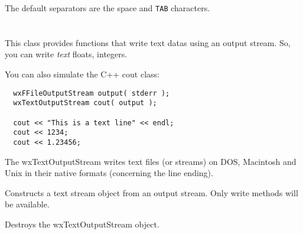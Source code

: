 The default separators are the space and {\tt TAB} characters.


\section{}\label{wxtextoutputstream}

This class provides functions that write text datas using an output stream.
So, you can write {\it text} floats, integers.

You can also simulate the C++ cout class:

\begin{verbatim}
  wxFFileOutputStream output( stderr );
  wxTextOutputStream cout( output );

  cout << "This is a text line" << endl;
  cout << 1234;
  cout << 1.23456;
\end{verbatim}

The wxTextOutputStream writes text files (or streams) on DOS, Macintosh
and Unix in their native formats (concerning the line ending).


\label{wxtextoutputstreamconstr}


Constructs a text stream object from an output stream. Only write methods will
be available.






Destroys the wxTextOutputStream object.



